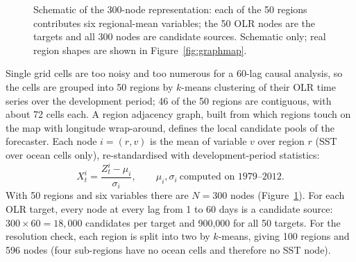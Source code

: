 \begin{figure}[htbp]
\centering
{}
\caption{Schematic of the 300-node representation: each of the 50 regions contributes six regional-mean variables; the 50 OLR nodes are the targets and all 300 nodes are candidate sources. Schematic only; real region shapes are shown in Figure~\ref{fig:graphmap}.}
\label{fig:nodes}
\end{figure}

Single grid cells are too noisy and too numerous for a 60-lag causal analysis, so the cells are grouped into 50 regions by $k$-means clustering of their OLR time series over the development period; 46 of the 50 regions are contiguous, with about 72 cells each. A region adjacency graph, built from which regions touch on the map with longitude wrap-around, defines the local candidate pools of the forecaster. Each node $i=(r,v)$ is the mean of variable $v$ over region $r$ (SST over ocean cells only), re-standardised with development-period statistics:
\begin{equation}
  X^{i}_t=\frac{Z^{i}_t-\mu_i}{\sigma_i},\qquad \mu_i,\sigma_i\ \text{computed on 1979--2012}.
  \label{eq:standardise}
\end{equation}
With 50 regions and six variables there are $N=300$ nodes (Figure~\ref{fig:nodes}). For each OLR target, every node at every lag from 1 to 60 days is a candidate source: $300\times60=18{,}000$ candidates per target and 900{,}000 for all 50 targets. For the resolution check, each region is split into two by $k$-means, giving 100 regions and 596 nodes (four sub-regions have no ocean cells and therefore no SST node).

